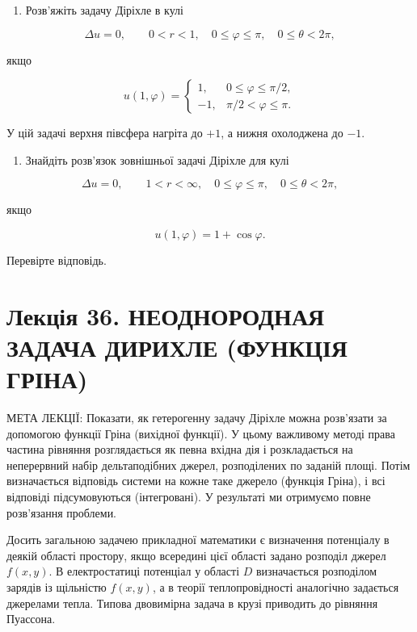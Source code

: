 \documentclass[
  ukrainian,
]{article}
\providecommand{\tightlist}{%
  \setlength{\itemsep}{0pt}\setlength{\parskip}{0pt}}
\begin{document}
\begin{enumerate}
\def\labelenumi{\arabic{enumi}.}
\setcounter{enumi}{1}
\tightlist
\item
  Розв'яжіть задачу Діріхле в кулі
\end{enumerate}

\[\Delta u = 0, \qquad 0 < r < 1,\quad 0 \le \varphi \le \pi,\quad 0 \le \theta < 2\pi,\]

якщо

\[u(1,\varphi)=\begin{cases}1, & 0 \le \varphi \le \pi/2,\\-1, & \pi/2 < \varphi \le \pi.\end{cases}\]

У цій задачі верхня півсфера нагріта до \(+1\), а нижня охолоджена до
\(-1\).

\begin{enumerate}
\def\labelenumi{\arabic{enumi}.}
\setcounter{enumi}{2}
\tightlist
\item
  Знайдіть розв'язок зовнішньої задачі Діріхле для кулі
\end{enumerate}

\[\Delta u = 0, \qquad 1 < r < \infty,\quad 0 \le \varphi \le \pi,\quad 0 \le \theta < 2\pi,\]

якщо

\[u(1,\varphi)=1+\cos\varphi.\]

Перевірте відповідь.

\section{Лекція 36. НЕОДНОРОДНАЯ ЗАДАЧА ДИРИХЛЕ (ФУНКЦІЯ
ГРІНА)}\label{ux43bux435ux43aux446ux456ux44f-36.-ux43dux435ux43eux434ux43dux43eux440ux43eux434ux43dux430ux44f-ux437ux430ux434ux430ux447ux430-ux434ux438ux440ux438ux445ux43bux435-ux444ux443ux43dux43aux446ux456ux44f-ux433ux440ux456ux43dux430}

МЕТА ЛЕКЦІЇ: Показати, як гетерогенну задачу Діріхле можна розв'язати за
допомогою функції Гріна (вихідної функції). У цьому важливому методі
права частина рівняння розглядається як певна вхідна дія і розкладається
на неперервний набір дельтаподібних джерел, розподілених по заданій
площі. Потім визначається відповідь системи на кожне таке джерело
(функція Гріна), і всі відповіді підсумовуються (інтегровані). У
результаті ми отримуємо повне розв'язання проблеми.

Досить загальною задачею прикладної математики є визначення потенціалу в
деякій області простору, якщо всередині цієї області задано розподіл
джерел \(f(x,y)\). В електростатиці потенціал у області \(D\)
визначається розподілом зарядів із щільністю \(f(x,y)\), а в теорії
теплопровідності аналогічно задається джерелами тепла. Типова двовимірна
задача в крузі приводить до рівняння Пуассона.
\end{document}
